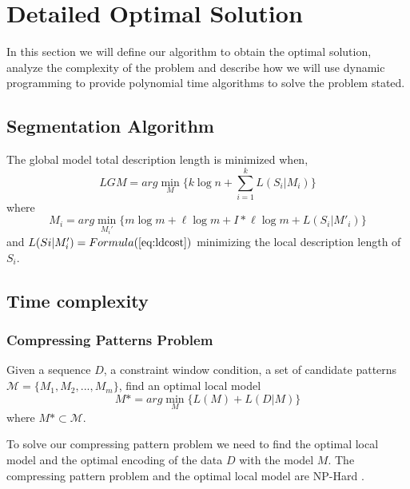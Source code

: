 \section{Detailed Optimal Solution}
In this section we will define our algorithm to obtain the optimal solution, analyze the complexity of the problem and describe how we will use dynamic programming to provide polynomial time algorithms to solve the problem stated.

\subsection{Segmentation Algorithm}
The global model total description length is minimized when,
\begin{equation}
LGM = arg \mathop{min}_{M} \{k \log n +\sum_{i=1}^{k}L(S_i|M_i)\}
\label{eq:lgm2}
\end{equation}
where
\begin{equation*}
M_i = arg \mathop{min}_{M_i'} \{ m\log m + \ell \log m + I * \ell \log m +L(S_i|M'_i)\}
\end{equation*}
and $L(Si|M'_{i}) = Formula (\ref{eq:ldcost})$
 minimizing the local description length of $S_i$.


\subsection{Time complexity}
\label{sec:time}
\subsubsection{Compressing Patterns Problem}
Given a sequence $D$, a constraint window condition, a set of candidate patterns $\mathcal{M}=\{M_1, M_2, ..., M_m\}$, find an optimal local model 
\begin{equation}
M \ast= arg \mathop{min}_{M} \{L(M)+L(D|M)\}
\end{equation}
where $M* \subset \mathcal{M}$.

To solve our compressing pattern problem we need to find the optimal local model and the optimal encoding of the data $D$ with the model $M$. The compressing pattern problem and the optimal local model are NP-Hard \cite{Lam:2014}.

